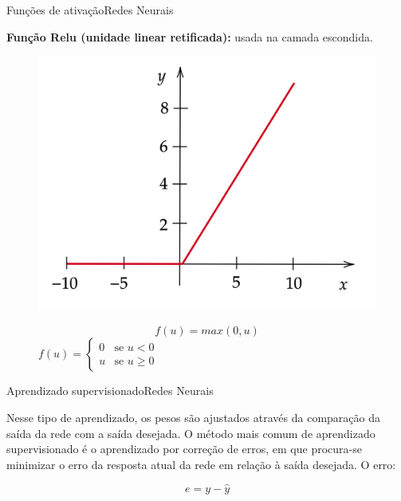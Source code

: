 \documentclass[t]{beamer}
\begin{document}
\begin{ftst}{Funções de ativação}{Redes Neurais}

\textbf{Função Relu (unidade linear retificada):} usada na camada escondida.

\begin{figure}[!htb]
    \centering
    \begin{minipage}{.5\textwidth}
        \centering
        \includegraphics[scale=0.12]{Figuras/relu.png}
        \label{fig:prob1_6_2}
    \end{minipage}%
    \begin{minipage}{0.5\textwidth}
        \centering
        \begin{equation}
            f(u) = max(0,u)
        \end{equation}
        $f(u) = \left\{\begin{matrix} 
                0 & \text{se } u < 0\\ 
                u & \text{se } u \geq 0
                \end{matrix}\right.$
    \end{minipage}
\end{figure}
\end{ftst}


\begin{ftst}{Aprendizado supervisionado}{Redes Neurais}

Nesse tipo de aprendizado, os pesos são ajustados através da comparação da saída da rede com a saída desejada.
\vone
O método mais comum de aprendizado supervisionado é o aprendizado por correção de erros, em que procura-se minimizar o erro da resposta atual da rede em relação à saída desejada.
\vone
O erro:
\vone

\begin{equation}
    e = y - \hat{y}
\end{equation}

\end{ftst}
\end{document}
